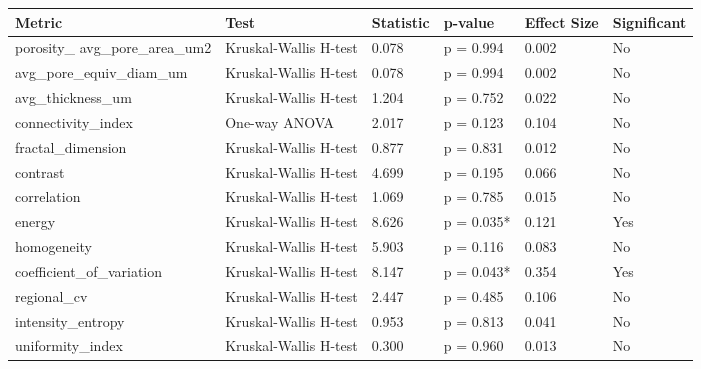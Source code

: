 \begin{tabular}{llllll}
\toprule
Metric & Test & Statistic & p-value & Effect Size & Significant \\
\midrule
porosity_%
avg_pore_area_um2 & Kruskal-Wallis H-test & 0.078 & p = 0.994 & 0.002 & No \\
avg_pore_equiv_diam_um & Kruskal-Wallis H-test & 0.078 & p = 0.994 & 0.002 & No \\
avg_thickness_um & Kruskal-Wallis H-test & 1.204 & p = 0.752 & 0.022 & No \\
connectivity_index & One-way ANOVA & 2.017 & p = 0.123 & 0.104 & No \\
fractal_dimension & Kruskal-Wallis H-test & 0.877 & p = 0.831 & 0.012 & No \\
contrast & Kruskal-Wallis H-test & 4.699 & p = 0.195 & 0.066 & No \\
correlation & Kruskal-Wallis H-test & 1.069 & p = 0.785 & 0.015 & No \\
energy & Kruskal-Wallis H-test & 8.626 & p = 0.035* & 0.121 & Yes \\
homogeneity & Kruskal-Wallis H-test & 5.903 & p = 0.116 & 0.083 & No \\
coefficient_of_variation & Kruskal-Wallis H-test & 8.147 & p = 0.043* & 0.354 & Yes \\
regional_cv & Kruskal-Wallis H-test & 2.447 & p = 0.485 & 0.106 & No \\
intensity_entropy & Kruskal-Wallis H-test & 0.953 & p = 0.813 & 0.041 & No \\
uniformity_index & Kruskal-Wallis H-test & 0.300 & p = 0.960 & 0.013 & No \\
\bottomrule
\end{tabular}
